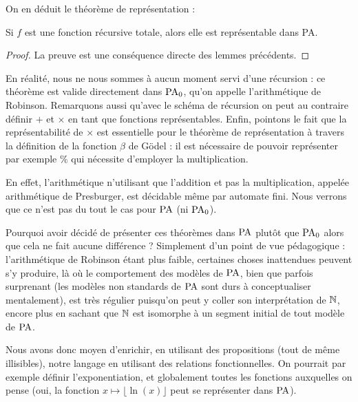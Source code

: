 On en déduit le théorème de représentation :

\begin{them}[Représentation]
    Si $f$ est une fonction récursive totale, alors elle est représentable dans PA.
\end{them}

\begin{proof}
    La preuve est une conséquence directe des lemmes précédents.
\end{proof}

\begin{rmk}
    En réalité, nous ne nous sommes à aucun moment servi d'une récursion : ce théorème est valide directement dans $\mathrm{PA}_0$, qu'on appelle l'arithmétique de Robinson. Remarquons aussi qu'avec le schéma de récursion on peut au contraire définir $+$ et $\times$ en tant que fonctions représentables. Enfin, pointons le fait que la représentabilité de $\times$ est essentielle pour le théorème de représentation à travers la définition de la fonction $\beta$ de Gödel : il est nécessaire de pouvoir représenter par exemple $\%$ qui nécessite d'employer la multiplication.

    En effet, l'arithmétique n'utilisant que l'addition et pas la multiplication, appelée arithmétique de Presburger, est décidable même par automate fini. Nous verrons que ce n'est pas du tout le cas pour $\mathrm{PA}$ (ni $\mathrm{PA}_0$).
\end{rmk}

\begin{rmk}
    Pourquoi avoir décidé de présenter ces théorèmes dans $\mathrm{PA}$ plutôt que $\mathrm{PA}_0$ alors que cela ne fait aucune différence ? Simplement d'un point de vue pédagogique : l'arithmétique de Robinson étant plus faible, certaines choses \og inattendues\fg{} peuvent s'y produire, là où le comportement des modèles de $\mathrm{PA}$, bien que parfois surprenant (les modèles non standards de $\mathrm{PA}$ sont durs à conceptualiser mentalement), est très régulier puisqu'on peut y coller son interprétation de $\mathbb{N}$, encore plus en sachant que $\mathbb{N}$ est isomorphe à un segment initial de tout modèle de $\mathrm{PA}$.
\end{rmk}

Nous avons donc moyen d'enrichir, en utilisant des propositions (tout de même illisibles), notre langage en utilisant des relations fonctionnelles. On pourrait par exemple définir l'exponentiation, et globalement toutes les fonctions auxquelles on pense (oui, la fonction $x\mapsto \lfloor \ln(x)\rfloor$  peut se représenter dans $\mathrm{PA}$).